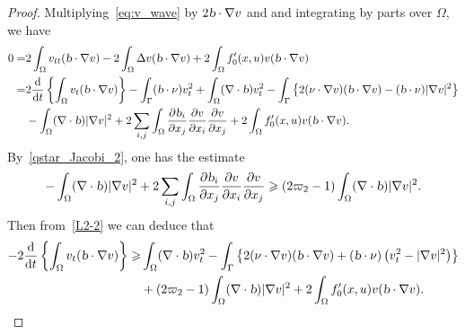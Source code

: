 \documentclass{elsarticle}
\begin{document}
\begin{proof}
Multiplying~\eqref{eq:v_wave} by $2\textsl{b}\cdot\nabla v$ and and integrating by parts over $\Omega$, we have
\begin{equation}\label{L2-2}
\begin{split}
    0=&2\int_{\Omega}v_{tt}(\textsl{b}\cdot\nabla v) - 2\int_{\Omega}\Delta v(\textsl{b}\cdot\nabla v) +2\int_{\Omega}f^{\prime}_0(x, u)v(\textsl{b}\cdot\nabla v)\\
      =&2\frac{\mathrm{d}}{\mathrm{d}t}\left\{\int_{\Omega}v_{t}(\textsl{b}\cdot\nabla v)\right\}-\int_{\Gamma}(\textsl{b}\cdot\nu) v_t^2+\int_{\Omega}(\nabla\cdot\textsl{b}) v_t^2-\int_{\Gamma}\left\{2(\nu\cdot\nabla v)(\textsl{b}\cdot\nabla v)-(\textsl{b}\cdot\nu)|\nabla v|^2\right\}\\
      & -\int_{\Omega}(\nabla\cdot\textsl{b})|\nabla v|^2+2 \sum_{i, j}\int_{\Omega} \frac{\partial \textsl{b}_i}{\partial x_j}\frac{\partial v}{\partial x_i}\frac{\partial v}{\partial x_j} + 2\int_{\Omega}f^{\prime}_0(x, u)v(\textsl{b}\cdot\nabla v).
\end{split}
\end{equation}
By~\eqref{qstar_Jacobi_2}, one has the estimate
\[
-\int_{\Omega}(\nabla\cdot\textsl{b})|\nabla v|^2 + 2 \sum_{i, j}\int_{\Omega} \frac{\partial \textsl{b}_i}{\partial x_j}\frac{\partial v}{\partial x_i}\frac{\partial v}{\partial x_j} \geqslant (2\varpi_2-1)\int_{\Omega}(\nabla\cdot\textsl{b})|\nabla v|^2.
\]
Then from~\eqref{L2-2} we can deduce that
\begin{equation}\label{L2-3}
\begin{split}
    -2\frac{\mathrm{d}}{\mathrm{d}t}\left\{\int_{\Omega}v_{t}(\textsl{b}\cdot\nabla v)\right\}\geqslant&\int_{\Omega}(\nabla\cdot\textsl{b}) v_t^2 -\int_{\Gamma}\left\{2(\nu\cdot\nabla v)(\textsl{b}\cdot\nabla v)+(\textsl{b}\cdot\nu)\left(v_t^2-|\nabla v|^2\right)\right\}\\
      & +(2\varpi_2-1)\int_{\Omega}(\nabla\cdot\textsl{b})|\nabla v|^2 + 2\int_{\Omega}f^{\prime}_0(x, u)v(\textsl{b}\cdot\nabla v).
\end{split}
\end{equation}


\end{proof}
\end{document}
